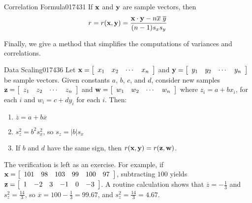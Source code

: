 \begin{theorem*}{Correlation Formula}{017431}
If $\textbf{x}$ and $\textbf{y}$ are sample vectors, then
\begin{equation*}
r = r(\vect{x}, \vect{y}) = \dfrac{\vect{x} \dotprod \vect{y} - n \overline{x} \; \overline{y}}{(n - 1)s_xs_y} \index{correlation formula}
\end{equation*}
\end{theorem*}

Finally, we give a method that simplifies the computations of variances and correlations.

\begin{theorem*}{Data Scaling}{017436}
Let $\textbf{x} = 
\left[ \begin{array}{cccc}
x_{1} & x_{2} & \cdots & x_{n}
\end{array} \right]$ and $\textbf{y} = 
\left[ \begin{array}{cccc}
y_{1} & y_{2} & \cdots & y_{n}
\end{array} \right]$ be sample vectors. Given constants $a$, $b$, $c$, and $d$, consider new samples $\textbf{z} = 
\left[ \begin{array}{cccc}
z_{1} & z_{2} & \cdots & z_{n}
\end{array} \right]$ and $\textbf{w} = 
\left[ \begin{array}{cccc}
w_{1} & w_{2} & \cdots & w_{n}
\end{array} \right]$ where $z_{i} = a + bx_{i}$, for each $i$ and $w_{i} = c + dy_{i}$ for each $i$. Then:

\begin{enumerate}[label={\alph*.}]
\item $\overline{z} = a + b\overline{x}$

\item $s_z^2 = b^2s_x^2$, so $s_z = |b|s_x$

\item If $b$ and $d$ have the same sign, then $r(\textbf{x}, \textbf{y}) = r(\textbf{z}, \textbf{w})$.

\end{enumerate}
\end{theorem*}

\noindent The verification is left as an exercise. For example, if $\textbf{x} = 
\left[ \begin{array}{cccccc}
101 & 98 & 103 & 99 & 100 & 97
\end{array} \right]$, subtracting $100$ yields $\textbf{z} = 
\left[ \begin{array}{cccccc}
1 & -2 & 3 & -1 & 0 & -3
\end{array} \right]$. A routine calculation shows that $\overline{z} = -\frac{1}{3}$ and $s_z^2 = \frac{14}{3}$, so $\overline{x} = 100 - \frac{1}{3} = 99.67$, and $s_z^2 = \frac{14}{3} = 4.67$.

